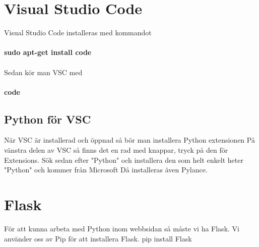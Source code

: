 \documentclass{TDP003mall}
\begin{document}
\section{Visual Studio Code}
Visual Studio Code installeras med kommandot\\\\
\textbf{sudo apt-get install code}\\\\ 
Sedan kör man VSC med\\\\
\textbf{code}
\subsection{Python för VSC}
När VSC är installerad och öppnad så bör man installera Python extensionen
På vänstra delen av VSC så finns det en rad med knappar, tryck på den för Extensions.
Sök sedan efter "Python" och installera den som helt enkelt heter "Python" och kommer från Microsoft
Då installeras även Pylance.


\section{Flask}
För att kunna arbeta med Python inom webbsidan så måste vi ha Flask. 
Vi använder oss av Pip för att installera Flask.
pip install Flask
\end{document}
